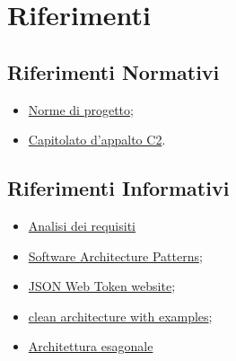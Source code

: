 \section{Riferimenti}
\subsection{Riferimenti Normativi}
\begin{itemize}
    \item \href{https://github.com/SWEasabi/norme-di-progetto/releases}{Norme di progetto};
    \item \href{https://www.math.unipd.it/~tullio/IS-1/2022/Progetto/C2.pdf}{Capitolato d'appalto C2}.
\end{itemize}

\subsection{Riferimenti Informativi}
\begin{itemize}
    \item \href{https://github.com/SWEasabi/analisi-dei-requisiti/releases}{Analisi dei requisiti}
    \item \href{https://www.math.unipd.it/~rcardin/swea/2022/Software%20Architecture%20Patterns.pdf}{Software Architecture Patterns};
    \item \href{https://jwt.io/}{JSON Web Token website};
    \item \href{https://dev.to/dyarleniber/hexagonal-architecture-and-clean-architecture-with-examples-48oi}{clean architecture with examples};
    \item \href{https://herbertograca.com/2017/11/16/explicit-architecture-01-ddd-hexagonal-onion-clean-cqrs-how-i-put-it-all-together/}{Architettura esagonale}
\end{itemize}